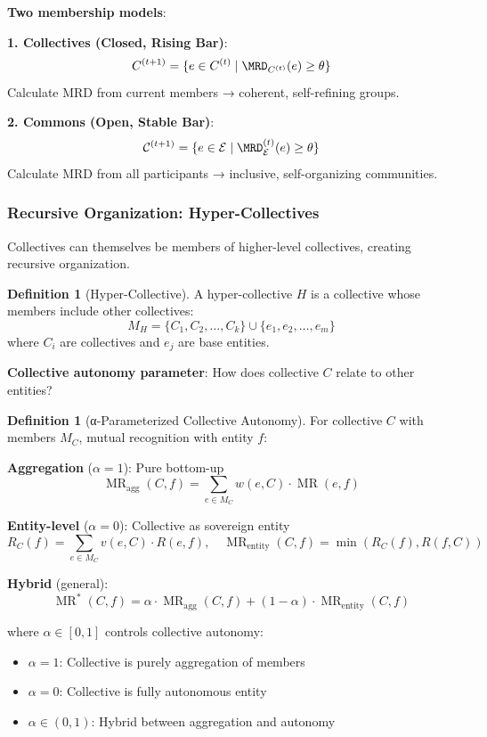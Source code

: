 \documentclass[11pt,a4paper]{article}
\theoremstyle{definition}
\newtheorem{definition}[theorem]{Definition}
\theoremstyle{remark}
\newcommand{\E}{\mathcal{E}}
\newcommand{\C}{\mathcal{C}}
\DeclareMathOperator{\MR}{MR}
\begin{document}
\textbf{Two membership models}:

\textbf{1. Collectives (Closed, Rising Bar)}:
\[ C^{(t+1)} = \{ e \in C^{(t)} \mid \MRD_{C^{(t)}}(e) \ge \theta \} \]
Calculate MRD from current members → coherent, self-refining groups.

\textbf{2. Commons (Open, Stable Bar)}:
\[ \C^{(t+1)} = \{ e \in \E \mid \MRD_{\E}^{(t)}(e) \ge \theta \} \]
Calculate MRD from all participants → inclusive, self-organizing communities.

\subsubsection{Recursive Organization: Hyper-Collectives}

Collectives can themselves be members of higher-level collectives, creating recursive organization.

\begin{definition}[Hyper-Collective]
A hyper-collective $H$ is a collective whose members include other collectives:
\[ M_H = \{C_1, C_2, \ldots, C_k\} \cup \{e_1, e_2, \ldots, e_m\} \]
where $C_i$ are collectives and $e_j$ are base entities.
\end{definition}

\textbf{Collective autonomy parameter}: How does collective $C$ relate to other entities?

\begin{definition}[α-Parameterized Collective Autonomy]
For collective $C$ with members $M_C$, mutual recognition with entity $f$:

\textbf{Aggregation} ($\alpha = 1$): Pure bottom-up
\[ \MR_{\text{agg}}(C,f) = \sum_{e \in M_C} w(e,C) \cdot \MR(e,f) \]

\textbf{Entity-level} ($\alpha = 0$): Collective as sovereign entity
\[ R_C(f) = \sum_{e \in M_C} v(e,C) \cdot R(e,f), \quad \MR_{\text{entity}}(C,f) = \min(R_C(f), R(f,C)) \]

\textbf{Hybrid} (general):
\[ \MR^*(C,f) = \alpha \cdot \MR_{\text{agg}}(C,f) + (1-\alpha) \cdot \MR_{\text{entity}}(C,f) \]

where $\alpha \in [0,1]$ controls collective autonomy:
\begin{itemize}
\item $\alpha = 1$: Collective is purely aggregation of members
\item $\alpha = 0$: Collective is fully autonomous entity
\item $\alpha \in (0,1)$: Hybrid between aggregation and autonomy
\end{itemize}
\end{definition}
\end{document}
